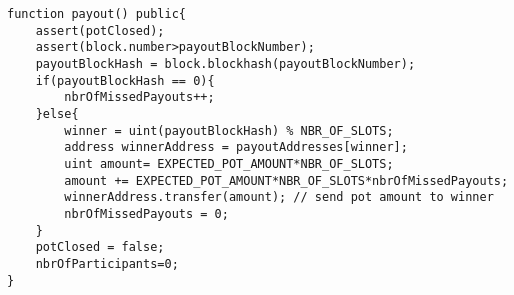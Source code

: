 \begin{lstlisting}
function payout() public{
    assert(potClosed);
    assert(block.number>payoutBlockNumber);
    payoutBlockHash = block.blockhash(payoutBlockNumber); 
    if(payoutBlockHash == 0){
        nbrOfMissedPayouts++;
    }else{
        winner = uint(payoutBlockHash) % NBR_OF_SLOTS;
        address winnerAddress = payoutAddresses[winner];
        uint amount= EXPECTED_POT_AMOUNT*NBR_OF_SLOTS;
        amount += EXPECTED_POT_AMOUNT*NBR_OF_SLOTS*nbrOfMissedPayouts;
        winnerAddress.transfer(amount); // send pot amount to winner
        nbrOfMissedPayouts = 0;
    }
    potClosed = false;
    nbrOfParticipants=0;
}
\end{lstlisting}

